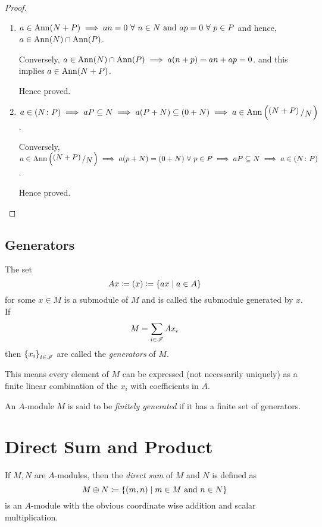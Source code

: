 \begin{proof} \
	\begin{enumerate}
		\item
		\(a \in \Ann(N+P) \implies an = 0\ \forall\ n \in N \AND ap = 0\
		\forall\ p \in P\)
		and hence, \(a \in \operatorname{Ann}(N) \cap \operatorname{Ann}(P)\).

		Conversely, \(a \in \operatorname{Ann}(N) \cap \operatorname{Ann}(P) \implies
		a(n+p) = an + ap = 0\).
		and this implies \(a \in \operatorname{Ann}(N+P)\).

		Hence proved.

		\item
		\(a \in \brak{N \colon P} \implies aP \subseteq N
		\implies a(P+N) \subseteq (0+N) \implies a \in
		\Ann\brak{\bigslant{\brak{N+P}}{N}}\).

		Conversely, \(a \in \Ann\brak{\bigslant{\brak{N+P}}{N}} \implies
		a(p + N) = (0 + N) \ \forall\ p \in P \implies aP \subseteq N
		\implies a \in \brak{N \colon P}\).

		Hence proved.
	\end{enumerate}
\end{proof}

\subsection{Generators}

The set
\[
	Ax \coloneqq \left( x \right) \coloneqq \left\{ ax \mid a \in A \right\}
\]
for some \(x \in M\) is a submodule of \(M\) and is called the submodule
generated by \(x\). \\

If
\[
	M = \sum_{i \in {\mathscr{I}}} A x_i
\]
then \(\left\{ x_i \right\}_{i \in {\mathscr{I}}}\) are called the \emph{generators} of \(M\).

This means every element of \(M\) can be expressed (not necessarily uniquely)
as a finite linear combination of the \(x_i\) with coefficients in \(A\).

An \(A\)-module \(M\) is said to be \emph{finitely generated} if it has a
finite set of generators.


\section{Direct Sum and Product}

If \(M, N\) are \(A\)-modules, then the \emph{direct sum} of \(M\) and \(N\)
is defined as
\[
	M \oplus N \coloneqq \left\{ \left( m, n \right) \mid m \in M \text{ and } n \in N \right\}
\]
is an \(A\)-module with the obvious coordinate wise
addition and scalar multiplication.

